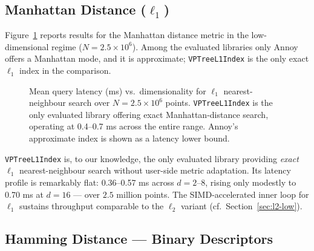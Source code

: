 \documentclass[11pt,a4paper]{article}
\begin{document}
\subsection{Manhattan Distance ($\ell_1$)}
\label{sec:l1}

Figure~\ref{fig:l1} reports results for the Manhattan distance metric in
the low-dimensional regime ($N = 2.5\times10^6$).  Among the evaluated
libraries only Annoy offers a Manhattan mode, and it is approximate;
\texttt{VPTreeL1Index} is the only exact $\ell_1$ index in the comparison.

\begin{figure}[h]
\centering
{}
\caption{Mean query latency (ms) vs.\ dimensionality for $\ell_1$
  nearest-neighbour search over $N = 2.5\times10^6$ points.
  \texttt{VPTreeL1Index} is the only evaluated library offering exact
  Manhattan-distance search, operating at 0.4--0.7 ms across the entire
  range.  Annoy's approximate index is shown as a latency lower bound.}
\label{fig:l1}
\end{figure}

\texttt{VPTreeL1Index} is, to our knowledge, the only evaluated library
providing \emph{exact} $\ell_1$ nearest-neighbour search without user-side
metric adaptation.  Its latency profile is remarkably flat: 0.36--0.57 ms
across $d = 2\text{--}8$, rising only modestly to 0.70 ms at $d=16$ — over
$2.5$ million points.  The SIMD-accelerated inner loop for $\ell_1$ sustains
throughput comparable to the $\ell_2$ variant
(cf.\ Section~\ref{sec:l2-low}).

\subsection{Hamming Distance — Binary Descriptors}
\label{sec:binary}
\end{document}
